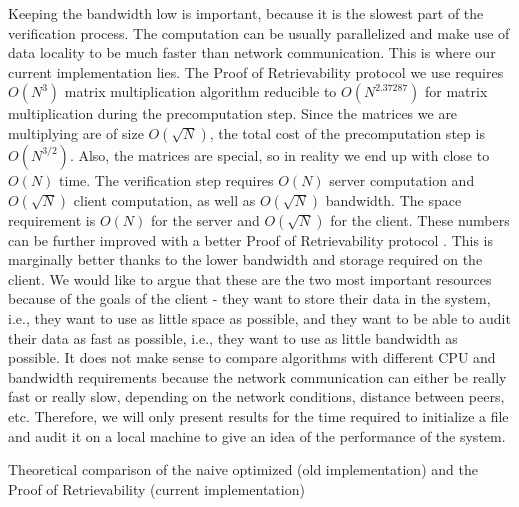 Keeping the bandwidth low is important, because it is the slowest part of the verification process.
The computation can be usually parallelized and make use of data locality to be much faster than network communication.
This is where our current implementation lies.
The Proof of Retrievability protocol we use requires $O(N^3)$ matrix multiplication algorithm reducible to $O(N^{2.37287})$ \cite{matrixmultiplication} for matrix multiplication during the precomputation step.
Since the matrices we are multiplying are of size $O(\sqrt{N})$, the total cost of the precomputation step is $O(N^{3/2})$.
Also, the matrices are special, so in reality we end up with close to $O(N)$ time.
The verification step requires $O(N)$ server computation and $O(\sqrt{N})$ client computation, as well as $O(\sqrt{N})$ bandwidth.
The space requirement is $O(N)$ for the server and $O(\sqrt{N})$ for the client.
These numbers can be further improved with a better Proof of Retrievability protocol \cite{pormerkle}.
This is marginally better thanks to the lower bandwidth and storage required on the client.
We would like to argue that these are the two most important resources because of the goals of the client - they want to store their data in the system, i.e., they want to use as little space as possible, and they want to be able to audit their data as fast as possible, i.e., they want to use as little bandwidth as possible.
It does not make sense to compare algorithms with different CPU and bandwidth requirements because the network communication can either be really fast or really slow, depending on the network conditions, distance between peers, etc.
Therefore, we will only present results for the time required to initialize a file and audit it on a local machine to give an idea of the performance of the system.

\begin{table}
  \myfloatalign
  \caption[]{Theoretical comparison of the naive optimized (old implementation) and the Proof of Retrievability (current implementation)}
  \label{tab:pretty-table}
\end{table}


